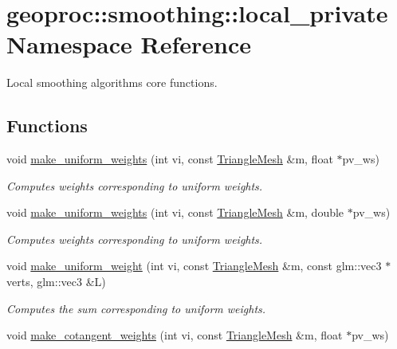 \hypertarget{namespacegeoproc_1_1smoothing_1_1local__private}{}\section{geoproc\+:\+:smoothing\+:\+:local\+\_\+private Namespace Reference}
\label{namespacegeoproc_1_1smoothing_1_1local__private}


Local smoothing algorithms core functions.  


\subsection*{Functions}
\begin{DoxyCompactItemize}
\item 
void \hyperlink{namespacegeoproc_1_1smoothing_1_1local__private_afa8f6895e6f658b6ec77da138347971f}{make\+\_\+uniform\+\_\+weights} (int vi, const \hyperlink{classgeoproc_1_1TriangleMesh}{Triangle\+Mesh} \&m, float $\ast$pv\+\_\+ws)
\begin{DoxyCompactList}\small\item\em Computes weights corresponding to uniform weights. \end{DoxyCompactList}\item 
void \hyperlink{namespacegeoproc_1_1smoothing_1_1local__private_a04fc2ea113fcafa38210c562dca3d735}{make\+\_\+uniform\+\_\+weights} (int vi, const \hyperlink{classgeoproc_1_1TriangleMesh}{Triangle\+Mesh} \&m, double $\ast$pv\+\_\+ws)
\begin{DoxyCompactList}\small\item\em Computes weights corresponding to uniform weights. \end{DoxyCompactList}\item 
void \hyperlink{namespacegeoproc_1_1smoothing_1_1local__private_a6f1acdf579d13e299b947a6619571df7}{make\+\_\+uniform\+\_\+weight} (int vi, const \hyperlink{classgeoproc_1_1TriangleMesh}{Triangle\+Mesh} \&m, const glm\+::vec3 $\ast$verts, glm\+::vec3 \&L)
\begin{DoxyCompactList}\small\item\em Computes the sum corresponding to uniform weights. \end{DoxyCompactList}\item 
void \hyperlink{namespacegeoproc_1_1smoothing_1_1local__private_a5ef9cdfdd013ff5b017f98ba9b94d280}{make\+\_\+cotangent\+\_\+weights} (int vi, const \hyperlink{classgeoproc_1_1TriangleMesh}{Triangle\+Mesh} \&m, float $\ast$pv\+\_\+ws)

\end{DoxyCompactItemize}

